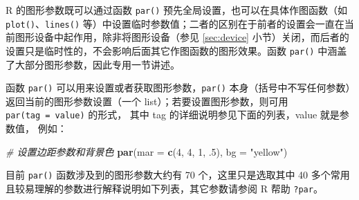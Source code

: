 \documentclass[
  b5paper,
  UTF8,twoside]{book}
\newenvironment{Shaded}{\begin{snugshade}}{\end{snugshade}}
\newcommand{\AttributeTok}[1]{\textcolor[rgb]{0.13,0.29,0.53}{#1}}
\newcommand{\CommentTok}[1]{\textcolor[rgb]{0.56,0.35,0.01}{\textit{#1}}}
\newcommand{\DecValTok}[1]{\textcolor[rgb]{0.00,0.00,0.81}{#1}}
\newcommand{\FunctionTok}[1]{\textcolor[rgb]{0.13,0.29,0.53}{\textbf{#1}}}
\newcommand{\NormalTok}[1]{#1}
\newcommand{\StringTok}[1]{\textcolor[rgb]{0.31,0.60,0.02}{#1}}
\begin{document}
R 的图形参数既可以通过函数 \texttt{par()} 预先全局设置，也可以在具体作图函数（如 \texttt{plot()}、\texttt{lines()} 等）中设置临时参数值；二者的区别在于前者的设置会一直在当前图形设备中起作用，除非将图形设备（参见 \ref{sec:device} 小节）关闭，而后者的设置只是临时性的，不会影响后面其它作图函数的图形效果。函数 \texttt{par()} 中涵盖了大部分图形参数，因此专用一节讲述。

函数 \texttt{par()} 可以用来设置或者获取图形参数，\texttt{par()} 本身（括号中不写任何参数）返回当前的图形参数设置（一个 list）；若要设置图形参数，则可用 \texttt{par(tag\ =\ value)} 的形式， 其中 tag 的详细说明参见下面的列表，value 就是参数值， 例如：

\begin{Shaded}
\begin{Highlighting}[]
\CommentTok{\# 设置边距参数和背景色}
\FunctionTok{par}\NormalTok{(}\AttributeTok{mar =} \FunctionTok{c}\NormalTok{(}\DecValTok{4}\NormalTok{, }\DecValTok{4}\NormalTok{, }\DecValTok{1}\NormalTok{, .}\DecValTok{5}\NormalTok{), }\AttributeTok{bg =} \StringTok{"yellow"}\NormalTok{)}
\end{Highlighting}
\end{Shaded}

目前 \texttt{par()} 函数涉及到的图形参数大约有 70 个，这里只是选取其中 40 多个常用且较易理解的参数进行解释说明如下列表，其它参数请参阅 R 帮助 \texttt{?par}。
\end{document}
